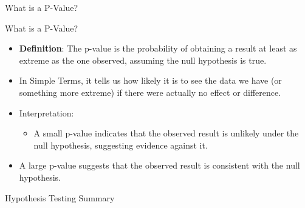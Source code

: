 \documentclass[
  ignorenonframetext,
]{beamer}
\providecommand{\tightlist}{%
  \setlength{\itemsep}{0pt}\setlength{\parskip}{0pt}}
\begin{document}
\begin{frame}{What is a P-Value?}
\label{what-is-a-p-value}
\end{frame}

\begin{frame}{What is a P-Value?}
\label{what-is-a-p-value-1}
\begin{itemize}
\tightlist
\item
  \textbf{Definition}: The p-value is the probability of obtaining a
  result at least as extreme as the one observed, assuming the null
  hypothesis is true.
\end{itemize}

\begin{itemize}
\tightlist
\item
  In Simple Terms, it tells us how likely it is to see the data we have
  (or something more extreme) if there were actually no effect or
  difference.
\end{itemize}

\begin{itemize}
\item
  Interpretation:

  \begin{itemize}
  \tightlist
  \item
    A small p-value indicates that the observed result is unlikely under
    the null hypothesis, suggesting evidence against it.
  \end{itemize}
\end{itemize}

\begin{itemize}
\tightlist
\item
  A large p-value suggests that the observed result is consistent with
  the null hypothesis.
\end{itemize}
\end{frame}

\begin{frame}{Hypothesis Testing Summary}
\label{hypothesis-testing-summary}
\end{frame}
\end{document}
